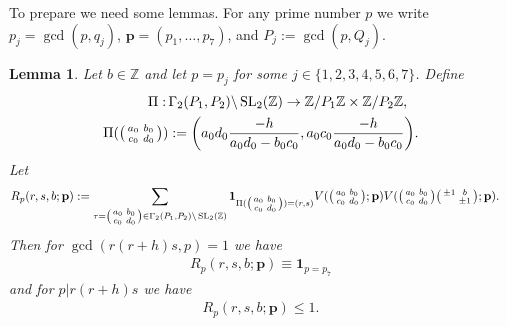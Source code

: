 \documentclass[12pt]{amsart}
\newtheorem{lemma}[theorem]{Lemma}
\theoremstyle{definition}
\theoremstyle{remark}
\numberwithin{equation}{section}
\newcommand{\Z}{{\mathbb Z}}
\newcommand{\1}{{\mathbf 1}}
\newcommand{\SL}{\operatorname{SL}_2}
\renewcommand{\c}{\mathfrak c}
\begin{document}
To prepare we need some lemmas. For any prime number $p$ we write $p_j=\gcd(p,q_j)$, $\mathbf{p}=(p_1,\dots,p_7)$, and $P_j := \gcd(p,Q_j)$.
\begin{lemma} \label{le:Rrsbound}
    Let $b\in \Z$ and let  $p=p_j$ for some $j\in\{1,2,3,4,5,6,7\}$. Define
    \begin{align*}
    \Pi: \,&\Gamma_2(P_1,P_2) \backslash \SL(\Z) \to \Z/P_1\Z \times \Z/P_2\Z, \\
        \Pi(\smqty(a_0 & b_0 \\ c_0 & d_0))  &:= \bigg( a_0 d_0 \frac{-h}{a_0 d_0-b_0c_0}, a_0 c_0 \frac{-h}{a_0 d_0-b_0c_0} \bigg).
    \end{align*}
    Let 
    \begin{align*}
        R_p(r,s,b;\mathbf{p})& :=   \sum_{\tau= \smqty(a_0 & b_0 \\ c_0 & d_0) \in \Gamma_2(P_1,P_2) \backslash \SL(\Z)} \mathbf{1}_{\Pi(\smqty(a_0 & b_0 \\ c_0 & d_0))  = (r,s)}   V(\smqty(a_0 & b_0 \\c_0 & d_0); \mathbf{p})   V(\smqty(a_0 & b_0 \\c_0 & d_0)\smqty(\pm 1 & b \\ & \pm 1); \mathbf{p}).
    \end{align*}
    Then for $\gcd(r(r+h)s,p)=1$ we have
    \begin{align*}
         R_p(r,s,b;\mathbf{p}) \equiv \mathbf{1}_{p=p_7} 
    \end{align*}
    and for $p|r(r+h)s$ we have
    \begin{align*}
         R_p(r,s,b;\mathbf{p}) \leq 1.
    \end{align*}
\end{lemma}
\end{document}

